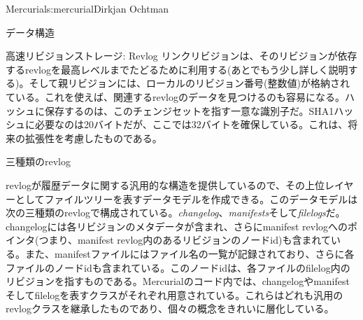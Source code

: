 \begin{aosachapter}{Mercurial}{s:mercurial}{Dirkjan Ochtman}
\begin{aosasect1}{データ構造}
\begin{aosasect2}{高速リビジョンストレージ: Revlog}
リンクリビジョンは、そのリビジョンが依存するrevlogを最高レベルまでたどるために利用する(あとでもう少し詳しく説明する)。そして親リビジョンには、ローカルのリビジョン番号(整数値)が格納されている。これを使えば、関連するrevlogのデータを見つけるのも容易になる。ハッシュに保存するのは、このチェンジセットを指す一意な識別子だ。SHA1ハッシュに必要なのは20バイトだが、ここでは32バイトを確保している。これは、将来の拡張性を考慮したものである。

\end{aosasect2}

\begin{aosasect2}{三種類のrevlog}

revlogが履歴データに関する汎用的な構造を提供しているので、その上位レイヤーとしてファイルツリーを表すデータモデルを作成できる。このデータモデルは次の三種類のrevlogで構成されている。\emph{changelog}、\emph{manifests}そして\emph{filelogs}だ。changelogには各リビジョンのメタデータが含まれ、さらにmanifest revlogへのポインタ(つまり、manifest revlog内のあるリビジョンのノードid)も含まれている。また、manifestファイルにはファイル名の一覧が記録されており、さらに各ファイルのノードidも含まれている。このノードidは、各ファイルのfilelog内のリビジョンを指すものである。Mercurialのコード内では、changelogやmanifestそしてfilelogを表すクラスがそれぞれ用意されている。これらはどれも汎用のrevlogクラスを継承したものであり、個々の概念をきれいに層化している。


\end{aosasect2}
\end{aosasect1}
\end{aosachapter}
